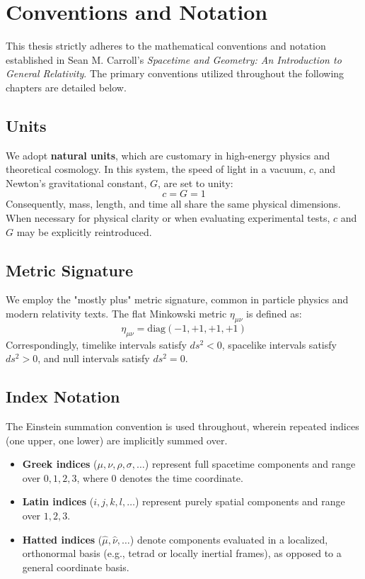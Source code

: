 \documentclass[11pt, a4paper]{report}
\begin{document}
\newpage
\tableofcontents
\newpage

\newcommand{\eqn}[1]{\hyperref[#1]{\eqref{#1}}}

\chapter*{Conventions and Notation}

This thesis strictly adheres to the mathematical conventions and notation established in Sean M. Carroll's \textit{Spacetime and Geometry: An Introduction to General Relativity}. The primary conventions utilized throughout the following chapters are detailed below.

\section*{Units}
We adopt \textbf{natural units}, which are customary in high-energy physics and theoretical cosmology. In this system, the speed of light in a vacuum, $c$, and Newton's gravitational constant, $G$, are set to unity:
\begin{equation}
c = G = 1
\end{equation}
Consequently, mass, length, and time all share the same physical dimensions. When necessary for physical clarity or when evaluating experimental tests, $c$ and $G$ may be explicitly reintroduced.

\section*{Metric Signature}
We employ the "mostly plus" metric signature, common in particle physics and modern relativity texts. The flat Minkowski metric $\eta_{\mu\nu}$ is defined as:
\begin{equation}
\eta_{\mu\nu} = \text{diag}(-1, +1, +1, +1)
\end{equation}
Correspondingly, timelike intervals satisfy $ds^2 < 0$, spacelike intervals satisfy $ds^2 > 0$, and null intervals satisfy $ds^2 = 0$.

\section*{Index Notation}
The Einstein summation convention is used throughout, wherein repeated indices (one upper, one lower) are implicitly summed over.
\begin{itemize}
    \item \textbf{Greek indices} ($\mu, \nu, \rho, \sigma, \dots$) represent full spacetime components and range over $0, 1, 2, 3$, where $0$ denotes the time coordinate.
    \item \textbf{Latin indices} ($i, j, k, l, \dots$) represent purely spatial components and range over $1, 2, 3$.
    \item \textbf{Hatted indices} ($\hat{\mu}, \hat{\nu}, \dots$) denote components evaluated in a localized, orthonormal basis (e.g., tetrad or locally inertial frames), as opposed to a general coordinate basis.
\end{itemize}
\end{document}
